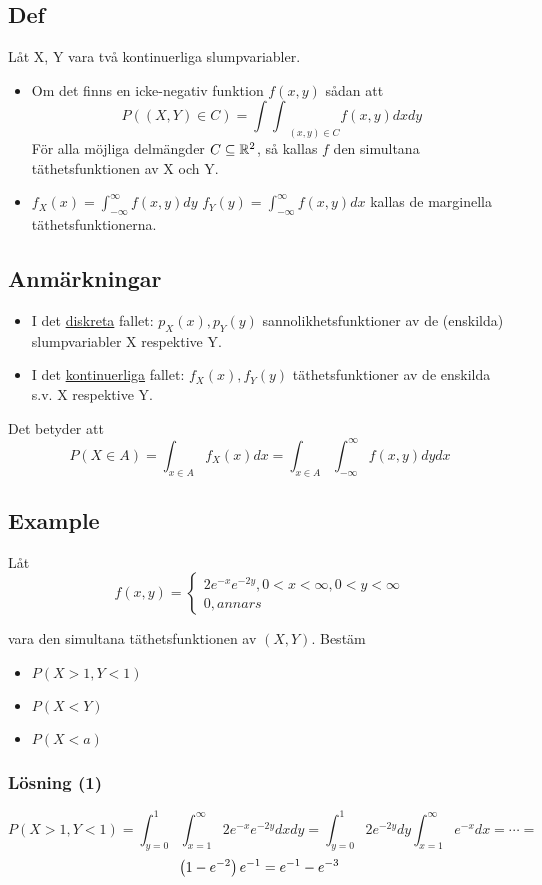 \documentclass{article}
\newcommand{\intf}{\int^{\infty}_{-\infty}}
\begin{document}
\subsection{Def}
Låt X, Y vara två kontinuerliga slumpvariabler.

\begin{itemize}
  \item Om det finns en icke-negativ funktion $f(x,y)$ sådan att
    $$ P((X,Y) \in C) = {\int \int}_{(x,y)\in C}f(x,y)dxdy $$
    För alla möjliga delmängder $C \subseteq {\mathbb R}^2$, så kallas $f$ den simultana täthetsfunktionen av X och Y.
  \item $f_X(x) = \intf f(x,y)dy$
   $f_Y(y) = \intf f(x,y)dx$
   kallas de marginella täthetsfunktionerna.
\end{itemize}

\subsection{Anmärkningar}

\begin{itemize}
  \item I det \underline{diskreta} fallet: $p_X(x), p_Y(y)$ sannolikhetsfunktioner av de (enskilda) slumpvariabler X respektive Y.
  \item I det \underline{kontinuerliga} fallet: $f_X(x), f_Y(y)$ täthetsfunktioner av de enskilda s.v. X respektive Y.
\end{itemize}
Det betyder att
$$ P(X\in A) = \int_{x\in A} f_X(x)dx = \int_{x\in A} \intf f(x,y) dydx $$

\subsection{Example}
Låt
$$
f(x,y)=
\begin{cases}
  2e^{-x}e^{-2y}, 0<x<\infty, 0<y<\infty\\
  0, annars
\end{cases}
$$

vara den simultana täthetsfunktionen av $(X, Y)$.
Bestäm
\begin{itemize}
  \item $P(X>1, Y<1)$
  \item $P(X<Y)$
  \item $P(X<a)$
\end{itemize}

\subsubsection{Lösning (1)}
$$P(X>1, Y<1) =
\int^{1}_{y=0} \int^{\infty}_{x=1} 2e^{-x}e^{-2y}dxdy  = \int^1_{y=0} 2e^{-2y} dy \int^{\infty}_{x=1} e^{-x}dx   = \cdots =$$
$$\left(1-e^{-2}\right)e^{-1} = e^{-1}-e^{-3}$$
\end{document}
